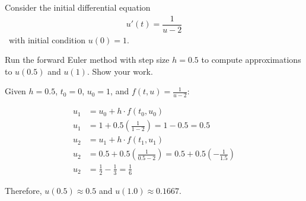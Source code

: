 \documentclass[reqno]{exam}
\begin{document}
\begin{questions}
\begin{solution}
  \end{solution}

  \newpage
  \question[10]
  Consider the initial differential equation
  \begin{align*}
    u'(t) = \dfrac{1}{u - 2}
  \end{align*}\
  with initial condition $u(0) = 1$.

  Run the forward Euler method with step size $h = 0.5$ to compute approximations to $u(0.5)$ and $u(1)$. Show your work.

  \begin{solution}

    Given $h = 0.5$, $t_0 = 0$, $u_0 = 1$, and $f(t, u) = \frac{1}{u-2}$:

    \begin{align*}
      u_1 & = u_0 + h \cdot f(t_0, u_0)                                                          \\
      u_1 & = 1 + 0.5 \left( \frac{1}{1-2} \right) = 1 - 0.5 = 0.5                               \\
      u_2 & = u_1 + h \cdot f(t_1, u_1)                                                          \\
      u_2 & = 0.5 + 0.5 \left( \frac{1}{0.5-2} \right) = 0.5 + 0.5 \left( -\frac{1}{1.5} \right) \\
      u_2 & = \frac{1}{2} - \frac{1}{3} = \frac{1}{6}
    \end{align*}

    Therefore, $u(0.5) \approx 0.5$ and $u(1.0) \approx 0.1667$.
  \end{solution}


\end{questions}
\end{document}
